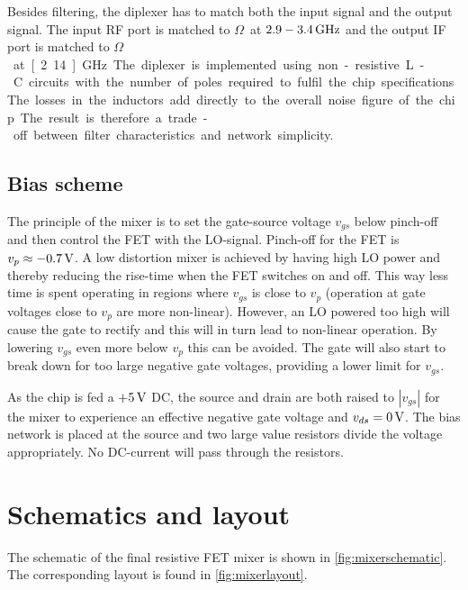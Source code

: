 			Besides  filtering, the diplexer has to match  both the input signal and the output signal. The input RF port is matched to \unit[50]{$\Omega$} at $\unit[2.9-3.4]{GHz}$ and the output IF port is matched to \unit[50]{$\Omega$} at \unit[2.14]{GHz}.

			The diplexer is implemented using non-resistive L-C circuits with the number of poles required to fulfil the chip specifications. The losses in the inductors add directly to the overall noise figure of the chip. The result is therefore a trade-off between filter characteristics and network simplicity.

		\subsection{Bias scheme}\label{sec:mixerbias}
			The principle of the mixer is to set the gate-source voltage $v_{gs}$ below pinch-off and then control the FET with the LO-signal. Pinch-off for the FET is $v_p\approx \unit[-0.7]{V}$. A low distortion mixer is achieved by having high LO power and thereby reducing the rise-time when the FET switches on and off. This way less time is spent operating in regions where $v_{gs}$ is close to $v_p$ (operation at gate voltages close to $v_p$ are more non-linear). However, an LO powered too high will cause the gate to rectify and this will in turn lead to non-linear operation.\autocite{maas98} By lowering $v_{gs}$ even more below $v_p$ this can be avoided. The gate will also start to break down for too large negative gate voltages, providing a lower limit for $v_{gs}$.

			As the chip is fed a $+\unit[5]{V}$ DC, the source and drain are both raised to $|v_{gs}|$ for the mixer to experience an effective negative gate voltage and $v_{ds}=\unit[0]{V}$. The bias network is placed at the source and two large value resistors divide the voltage appropriately. No DC-current will pass through the resistors.

	\section{Schematics and layout}
		The schematic of the final resistive FET mixer is shown in \autoref{fig:mixerschematic}. The corresponding layout is found in \autoref{fig:mixerlayout}.

